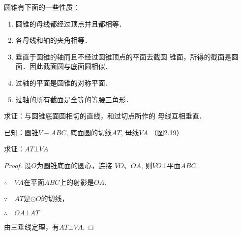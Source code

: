 圆锥有下面的一些性质：
\begin{enumerate}
\item 圆锥的母线都经过顶点并且都相等．
\item 各母线和轴的夹角相等．
\item 垂直于圆锥的轴而且不经过圆锥顶点的平面去截圆
锥面，所得的截面是圆面．因此截面圆与底面圆相似．
\item 过轴的平面是圆锥的对称平面．
\item 过轴的所有截面是全等的等腰三角形．
\end{enumerate}


\begin{example}
求证：与圆锥底面圆相切的直线，和过切点所作的
母线互相垂直．

已知：圆锥$V-ABC$, 底面圆的切线$AT$, 母线$VA$
（图2.19）

\begin{figure}[htp]
    \centering
{}
    \caption{}
\end{figure}

求证：$AT\bot VA$
\end{example}

\begin{proof}
设$O$为圆锥底面的圆心，连接
$VO$、$OA$, 则$VO\bot$平面$ABC$.

$\therefore\quad VA$在平面$ABC$上的射影是$OA$.

$\because\quad AT$是$\odot O$的切线，

$\therefore\quad OA\bot AT$

由三垂线定理，有$AT\bot VA$.
\end{proof}

